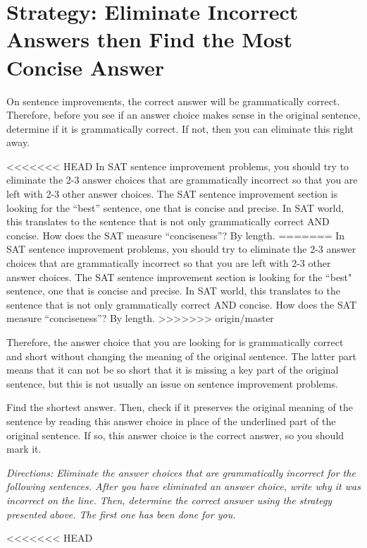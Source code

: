 \section{\sloppy Strategy: Eliminate Incorrect Answers then Find the Most Concise Answer}

On sentence improvements, the correct answer will be grammatically correct. Therefore, before
you see if an answer choice makes sense in the original sentence, determine if it is grammatically
correct. If not, then you can eliminate this right away.

<<<<<<< HEAD
In SAT sentence improvement problems, you should try to eliminate the 2-3 answer choices that are grammatically incorrect so that you are left with 2-3 other answer choices. The SAT sentence improvement section is looking for the ``best'' sentence, one that is concise and precise. In SAT world, this translates to the sentence that is not only grammatically correct AND concise. How does the SAT measure ``conciseness''? By length.
=======
\bigskip
In SAT sentence improvement problems, you should try to eliminate the 2-3 answer choices that are grammatically incorrect so that you are left with 2-3 other answer choices. The SAT sentence improvement section is looking for the ``best" sentence, one that is concise and precise. In SAT world, this translates to the sentence that is not only grammatically correct AND concise. How does the SAT measure ``conciseness''? By length.
>>>>>>> origin/master

\bigskip
Therefore, the answer choice that you are looking for is grammatically correct and short without changing the meaning of the original sentence. The latter part means that it can not be so short that it is missing a key part of the original sentence,
but this is not usually an issue on sentence improvement problems.

\bigskip
Find the shortest answer. Then, check if it preserves the original meaning of the sentence by reading this answer choice in place of the underlined part of the original sentence. If so, this answer choice is the correct answer, so you should mark it.

\bigskip
\textit{Directions: Eliminate the answer choices that are grammatically incorrect for the following sentences. After you have eliminated an answer choice, write why it was incorrect on the line. Then, determine the correct answer using the strategy presented above. The first one has been done for you.}

<<<<<<< HEAD


